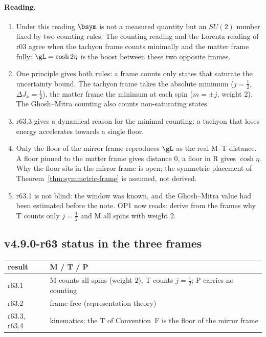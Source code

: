 \paragraph{Reading.}
\begin{enumerate}[leftmargin=2em]
\item Under this reading \(\bsym\) is not a measured quantity but an \(SU(2)\) number fixed by two counting rules.  The counting reading and the Lorentz reading of r03 agree
when the tachyon frame counts minimally and the matter frame fully: \(\gL=\cosh2\eta\) is the boost between these two opposite frames.
\item One principle gives both rules: a frame counts only states that saturate the uncertainty bound.  The tachyon frame takes the absolute minimum (\(j=\tfrac12\),
\(\Delta J_x=\tfrac12\)), the matter frame the minimum at each spin (\(m=\pm j\), weight \(2\)).  The Ghosh--Mitra counting also counts non-saturating states.
\item r63.3 gives a dynamical reason for the minimal counting: a tachyon that loses energy accelerates towards a single floor.
\item Only the floor of the mirror frame reproduces \(\gL\) as the real M--T distance.  A floor pinned to the matter frame gives distance \(0\), a floor in R gives
\(\cosh\eta\).  Why the floor sits in the mirror frame is open; the symmetric placement of Theorem~\ref{thm:symmetric-frame} is assumed, not derived.
\item r63.1 is not blind: the window was known, and the Ghosh--Mitra value had been estimated before the note.  OP1 now reads: derive from the frames why T counts only
\(j=\tfrac12\) and M all spins with weight \(2\).
\end{enumerate}

\subsection*{v4.9.0-r63 status in the three frames}
\label{subsec:v490-r63-frames}

\begin{center}
\small
\begin{tabular}{@{}>{\raggedright\arraybackslash}p{}>{\raggedright\arraybackslash}p{}@{}}
\toprule
result & M / T / P\\
\midrule
r63.1 & M counts all spins (weight \(2\)), T counts \(j=\tfrac12\); P carries no counting\\
r63.2 & frame-free (representation theory)\\
r63.3, r63.4 & kinematics; the T of Convention~F is the floor of the mirror frame\\
\bottomrule
\end{tabular}
\end{center}

